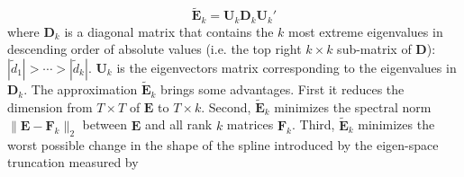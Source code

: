 \documentclass{article}\usepackage[]{graphicx}\usepackage[]{color}
\begin{document}
\[ \tilde{\mathbf{E }}_k = \mathbf{U}_k \mathbf{D}_k \mathbf{U}_k' \]
where $\mathbf{D}_k$ is a diagonal matrix that contains the $k$ most extreme eigenvalues in descending order of absolute values (i.e. the top right $k \times k$ sub-matrix of $\mathbf{D}$): $|\tilde{d}_1|>\cdots >|\tilde{d}_ k|$. $\mathbf{U}_k$ is the eigenvectors matrix corresponding to the eigenvalues in $\mathbf{D}_k$. The approximation $\tilde{\mathbf{E}}_k$ brings some advantages. First it reduces the dimension from $T\times T$ of $\mathbf{E}$ to $T\times k$. Second, $\tilde{\mathbf{E}}_k$ minimizes the spectral norm $\| \mathbf{E} -\mathbf{F}_k\| _2$ between $\mathbf{E}$ and all rank $k$ matrices $\mathbf{F}_k$. Third, $\tilde{\mathbf{E}}_k$ minimizes the worst possible change in the shape of the spline introduced by the eigen-space truncation measured by
\end{document}
